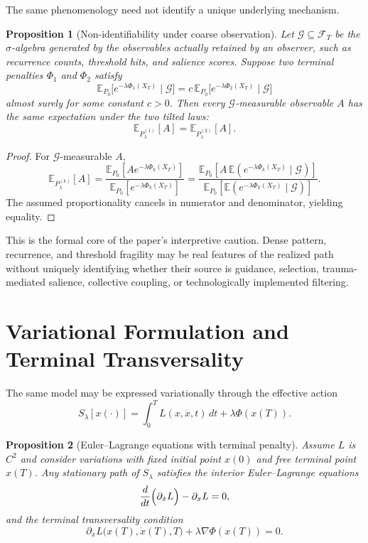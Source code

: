 \documentclass[12pt]{article}
\newtheorem{proposition}{Proposition}
\begin{document}
The same phenomenology need not identify a unique underlying mechanism.

\begin{proposition}[Non-identifiability under coarse observation]
Let $\mathcal G \subseteq \mathcal F_T$ be the $\sigma$-algebra generated by the observables actually retained by an observer, such as recurrence counts, threshold hits, and salience scores. Suppose two terminal penalties $\Phi_1$ and $\Phi_2$ satisfy
\[
\mathbb E_{P_0}\bigl[e^{-\lambda \Phi_1(X_T)}\mid \mathcal G\bigr]
= c\,\mathbb E_{P_0}\bigl[e^{-\lambda \Phi_2(X_T)}\mid \mathcal G\bigr]
\]
almost surely for some constant $c>0$. Then every $\mathcal G$-measurable observable $A$ has the same expectation under the two tilted laws:
\[
\mathbb E_{P_\lambda^{(1)}}[A] = \mathbb E_{P_\lambda^{(2)}}[A].
\]
\end{proposition}

\begin{proof}
For $\mathcal G$-measurable $A$,
\[
\mathbb E_{P_\lambda^{(k)}}[A]
= \frac{\mathbb E_{P_0}[A e^{-\lambda \Phi_k(X_T)}]}{\mathbb E_{P_0}[e^{-\lambda \Phi_k(X_T)}]}
= \frac{\mathbb E_{P_0}[A\,\mathbb E(e^{-\lambda \Phi_k(X_T)}\mid \mathcal G)]}{\mathbb E_{P_0}[\mathbb E(e^{-\lambda \Phi_k(X_T)}\mid \mathcal G)]}.
\]
The assumed proportionality cancels in numerator and denominator, yielding equality.
\end{proof}

This is the formal core of the paper's interpretive caution. Dense pattern, recurrence, and threshold fragility may be real features of the realized path without uniquely identifying whether their source is guidance, selection, trauma-mediated salience, collective coupling, or technologically implemented filtering.

\section{Variational Formulation and Terminal Transversality}

The same model may be expressed variationally through the effective action
\[
S_\lambda[x(\cdot)] = \int_0^T L(x,\dot{x},t)\,dt + \lambda \Phi(x(T)).
\]

\begin{proposition}[Euler--Lagrange equations with terminal penalty]
Assume $L$ is $C^2$ and consider variations with fixed initial point $x(0)$ and free terminal point $x(T)$. Any stationary path of $S_\lambda$ satisfies the interior Euler--Lagrange equations
\[
\frac{d}{dt}\Bigl(\partial_{\dot x} L\Bigr) - \partial_x L = 0,
\]
and the terminal transversality condition
\[
\partial_{\dot x}L\bigl(x(T),\dot x(T),T\bigr) + \lambda \nabla \Phi(x(T)) = 0.
\]
\end{proposition}
\end{document}

